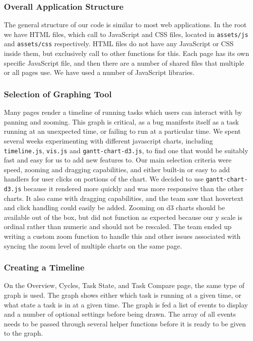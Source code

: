\documentclass{hmcclinic}
\begin{document}
  \subsubsection{Overall Application Structure}

  The general structure of our code is similar to
  most web applications. In the root we have HTML files, which call to
  JavaScript and CSS files, located in \texttt{assets/js} and
  \texttt{assets/css} respectively.
  HTML files do not have any JavaScript or CSS inside them, but exclusively call
  to other functions for this. Each page has its own specific JavaScript file,
  and then there are a number of shared files that multiple or all pages use. We
  have used a number of JavaScript libraries.
  
  \subsubsection{Selection of Graphing Tool} %
  Many pages render a timeline of running tasks which users can interact
  with by panning and zooming. This graph is critical, as a bug manifests
  itself as a task running at an unexpected time, or failing to run at a
  particular time. We spent several weeks experimenting with different
  javascript charts, including \texttt{timeline.js}, \texttt{vis.js} and
  \texttt{gantt-chart-d3.js},
  to find one that would be suitably fast and easy for us to add new
  features to. Our main selection criteria were speed, zooming and dragging
  capabilities, and either built-in or easy to add handlers for user clicks
  on portions of the chart. We decided to use \texttt{gantt-chart-d3.js} because it
  rendered more quickly and was more responsive than the other charts. It
  also came with dragging capabilities, and the team saw that hovertext and
  click handling could easily be added. Zooming on d3 charts should be
  available out of the box, but did not function as expected because our y scale
  is ordinal rather than numeric and should not be rescaled. The team
  ended up writing a custom zoom function to handle this and other issues
  associated with syncing the zoom level of multiple charts on the same page.
  
  \subsubsection{Creating a Timeline}
  On the Overview, Cycles, Task State, and Task Compare page, the same type of
  graph is used. The graph shows either which task is running at a given time,
  or what state a task is in at a given time. The graph is fed a list of
  events to display and a number of optional settings before being drawn. The
  array of all events needs to be passed through several helper functions
  before it is ready to be given to the graph.
  
\end{document}
